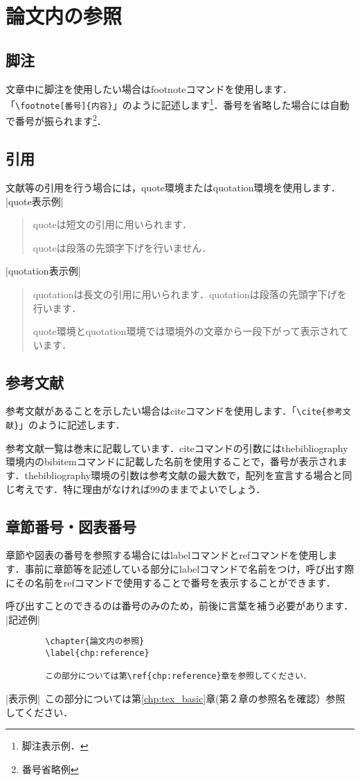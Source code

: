\chapter{論文内の参照}
\label{chp:reference}

\section{脚注}
\label{sec:reference_ftnote}
	文章中に脚注を使用したい場合はfootnoteコマンドを使用します．「\verb|\footnote[番号]{内容}|」のように記述します\footnote[99]{脚注表示例．}．番号を省略した場合には自動で番号が振られます\footnote{番号省略例}．

\section{引用}
\label{sec:reference_quote}
	文献等の引用を行う場合には，quote環境またはquotation環境を使用します．\\
	|quote表示例|
	\begin{quote}
		quoteは短文の引用に用いられます．

		quoteは段落の先頭字下げを行いません．
	\end{quote}
	|quotation表示例|
	\begin{quotation}
		quotationは長文の引用に用いられます．quotationは段落の先頭字下げを行います．

		quote環境とquotation環境では環境外の文章から一段下がって表示されています．
	\end{quotation}

\section{参考文献}
\label{sec:reference_bib}
	参考文献があることを示したい場合はciteコマンドを使用します．「\verb|\cite{参考文献}|」のように記述します\cite{Webデザイン}．

	参考文献一覧は巻末に記載しています．citeコマンドの引数にはthebibliography環境内のbibitemコマンドに記載した名前を使用することで，番号が表示されます．thebibliography環境の引数は参考文献の最大数で，配列を宣言する場合と同じ考えです．特に理由がなければ99のままでよいでしょう．

\section{章節番号・図表番号}
\label{sec:reference_chapter}
	章節や図表の番号を参照する場合にはlabelコマンドとrefコマンドを使用します．事前に章節等を記述している部分にlabelコマンドで名前をつけ，呼び出す際にその名前をrefコマンドで使用することで番号を表示することができます．

	呼び出すことのできるのは番号のみのため，前後に言葉を補う必要があります．\\
	|記述例|
	\begin{verbatim}
		\chapter{論文内の参照}
		\label{chp:reference}

		この部分については第\ref{chp:reference}章を参照してください．
	\end{verbatim}
	|表示例|\
		この部分については第\ref{chp:tex_basic}章(第２章の参照名を確認）参照してください．
	